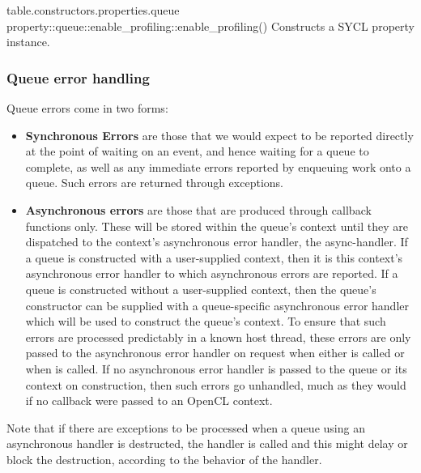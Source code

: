 {table.constructors.properties.queue}
\addRow
{property::queue::enable_profiling::enable_profiling()}
{
  Constructs a SYCL  property instance.
}
\completeTable

\subsubsection{Queue error handling}
\label{sec:interface.queue.errors}

Queue errors come in two forms:
\begin{itemize}

  \item
    \textbf{Synchronous Errors} are those that we would expect to be
    reported directly at the point of waiting on an event, and hence
    waiting for a queue to complete, as well as any immediate errors
    reported by enqueuing work onto a queue. Such errors are returned
    through exceptions.

  \item
    \textbf{Asynchronous errors} are those that are produced through
    callback functions only. These will be stored within the queue's
    context until they are dispatched to the context's asynchronous
    error handler, the \gls{async-handler}. If a queue is constructed 
    with a user-supplied context, then it is this context's asynchronous error
    handler to which asynchronous errors are reported. If a queue is constructed
    without a user-supplied context, then the queue's constructor
    can be supplied with a queue-specific asynchronous error handler
    which will be used to construct the queue's context.
    To ensure that such errors are
    processed predictably in a known host thread, these errors are only
    passed to the asynchronous error handler on request when either
     is called or when
     is called. If no
    asynchronous error handler is passed to the queue or its context
    on construction, then such errors go unhandled, much as they would
    if no callback were passed to an OpenCL context.

\end{itemize}

Note that if there are exceptions to be processed when a queue
using an asynchronous handler is destructed, the handler is called and
this might delay or block the destruction, according to the behavior
of the handler.


